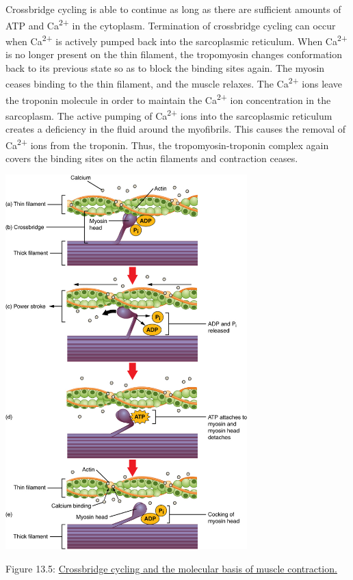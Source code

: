 Crossbridge cycling is able to continue as long as there are sufficient
amounts of ATP and Ca\textsuperscript{2+} in the cytoplasm. Termination
of crossbridge cycling can occur when Ca\textsuperscript{2+} is actively
pumped back into the sarcoplasmic reticulum. When Ca\textsuperscript{2+}
is no longer present on the thin filament, the tropomyosin changes
conformation back to its previous state so as to block the binding sites
again. The myosin ceases binding to the thin filament, and the muscle
relaxes. The Ca\textsuperscript{2+} ions leave the troponin molecule in
order to maintain the Ca\textsuperscript{2+} ion concentration in the
sarcoplasm. The active pumping of Ca\textsuperscript{2+} ions into the
sarcoplasmic reticulum creates a deficiency in the fluid around the
myofibrils. This causes the removal of Ca\textsuperscript{2+} ions from
the troponin. Thus, the tropomyosin-troponin complex again covers the
binding sites on the actin filaments and contraction ceases.

\protect\hypertarget{fig:crossbridge}{}{}
\includegraphics[width=0.7\textwidth,height=\textheight]{figures/motor/1008_Skeletal_Muscle_Contraction.jpg}

Figure 13.5:
\href{https://commons.wikimedia.org/wiki/File:1008_Skeletal_Muscle_Contraction.jpg}{Crossbridge
cycling and the molecular basis of muscle contraction.}

